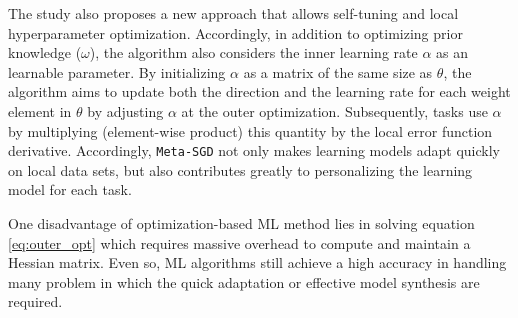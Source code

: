 
The \cite{li2017meta} study also proposes a new approach that allows self-tuning and local hyperparameter optimization. Accordingly, in addition to optimizing prior knowledge ($\omega$), the algorithm also considers the inner learning rate $\alpha$ as an learnable parameter. By initializing $\alpha$ as a matrix of the same size as $\theta$, the algorithm aims to update both the direction and the learning rate for each weight element in $\theta$ by adjusting $\alpha$ at the outer optimization. Subsequently, tasks use $\alpha$ by multiplying (element-wise product) this quantity by the local error function derivative. Accordingly, \verb|Meta-SGD| not only makes learning models adapt quickly on local data sets, but also contributes greatly to personalizing the learning model for each task.

One disadvantage of optimization-based ML method lies in solving equation \ref{eq:outer_opt} which requires massive overhead to compute and maintain a Hessian matrix. Even so, ML algorithms still achieve a high accuracy in handling many problem in which the quick adaptation or effective model synthesis are required.
